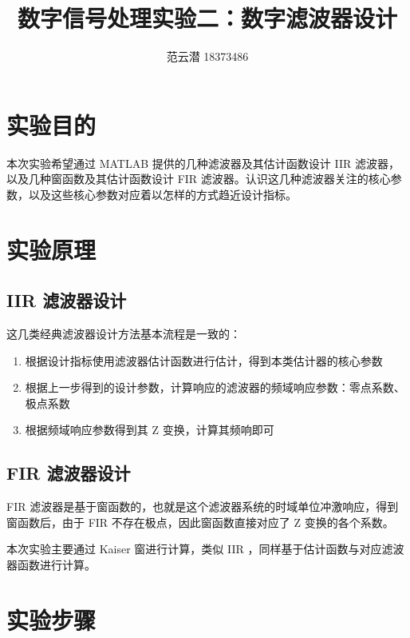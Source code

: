 \documentclass[lang=cn,11pt,a4paper,cite=authoryear]{elegantpaper}
\title{数字信号处理实验二：数字滤波器设计}
\author{范云潜 18373486}
\institute{微电子学院 184111 班}
\date{\zhtoday}
\begin{document}
\maketitle


\tableofcontents

\listoffigures




\section{实验目的}

本次实验希望通过 MATLAB 提供的几种滤波器及其估计函数设计 IIR 滤波器，以及几种窗函数及其估计函数设计 FIR 滤波器。认识这几种滤波器关注的核心参数，以及这些核心参数对应着以怎样的方式趋近设计指标。

\section{实验原理}

\subsection{IIR 滤波器设计}

这几类经典滤波器设计方法基本流程是一致的：

\begin{enumerate}
    \item 根据设计指标使用滤波器估计函数进行估计，得到本类估计器的核心参数
    \item 根据上一步得到的设计参数，计算响应的滤波器的频域响应参数：零点系数、极点系数
    \item 根据频域响应参数得到其 Z 变换，计算其频响即可
\end{enumerate}


\subsection{FIR 滤波器设计}

FIR 滤波器是基于窗函数的，也就是这个滤波器系统的时域单位冲激响应，得到窗函数后，由于 FIR 不存在极点，因此窗函数直接对应了 Z 变换的各个系数。

本次实验主要通过 Kaiser 窗进行计算，类似 IIR ，同样基于估计函数与对应滤波器函数进行计算。

\section{实验步骤}
\end{document}
